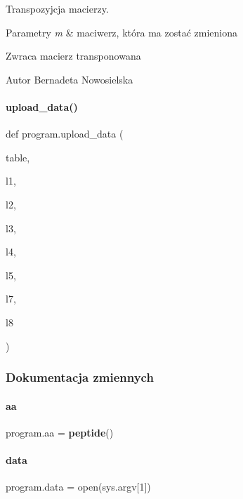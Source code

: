 Transpozyjcja macierzy. 


\begin{DoxyParams}{Parametry}
{\em m} & maciwerz, która ma zostać zmieniona \\
\hline
\end{DoxyParams}
\begin{DoxyReturn}{Zwraca}
macierz transponowana 
\end{DoxyReturn}
\begin{DoxyAuthor}{Autor}
Bernadeta Nowosielska 
\end{DoxyAuthor}
\mbox{\label{namespaceprogram_a6255a3e5fb73276a27d53b35a0f6423c}} 
\paragraph{upload\+\_\+data()}
{\footnotesize\ttfamily def program.\+upload\+\_\+data (\begin{DoxyParamCaption}\item[{}]{table,  }\item[{}]{l1,  }\item[{}]{l2,  }\item[{}]{l3,  }\item[{}]{l4,  }\item[{}]{l5,  }\item[{}]{l7,  }\item[{}]{l8 }\end{DoxyParamCaption})}



\subsubsection{Dokumentacja zmiennych}
\mbox{\label{namespaceprogram_aaac913534cc4f0ac2d38962f6f53f81c}} 
\paragraph{aa}
{\footnotesize\ttfamily program.\+aa = \textbf{ peptide}()}

\mbox{\label{namespaceprogram_a044b3e27d1a91ad8a3a66ac4f32668f1}} 
\paragraph{data}
{\footnotesize\ttfamily program.\+data = open(sys.\+argv[1])}

